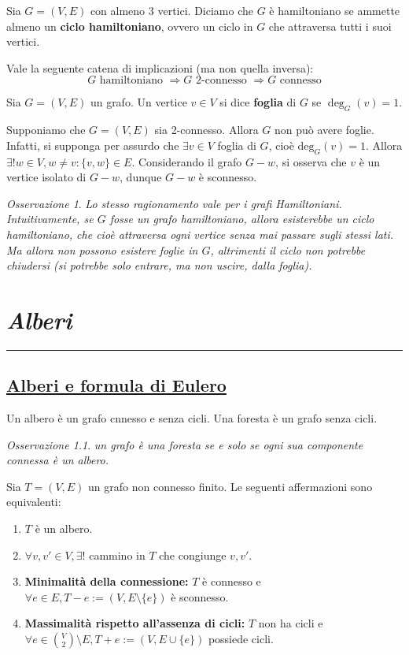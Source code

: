 \documentclass[oneside]{book}
\theoremstyle{remark}
\newtheorem*{osservaz}{Osservazione}
\newcommand{\chptr}[1]{\chapter{\textit{#1}}\noindent\rule{\textwidth}{1pt}}
\newcommand{\teorema}[1]{\section{\underline{#1}}}
\begin{document}
\begin{tcolorbox}[colback=yellow!30, colframe=yellow!30!black, title=Grafo Hamiltoniano]
Sia $G=(V,E)$ con almeno 3 vertici. Diciamo che $G$ è hamiltoniano se ammette
almeno un \textbf{ciclo hamiltoniano}, ovvero un ciclo in $G$ che attraversa
tutti i suoi vertici.
\end{tcolorbox}
\noindent Vale la seguente catena di implicazioni (ma non quella inversa):
\[ G \text{ hamiltoniano } \Longrightarrow G \text{ 2-connesso } \Longrightarrow G \text{ connesso} \]
\begin{tcolorbox}[colback=yellow!30, colframe=yellow!30!black, title=Foglia]
Sia $G=(V,E)$ un grafo. Un vertice $v\in V$ si dice \textbf{foglia} di $G$
se $\deg_G(v)=1$.
\end{tcolorbox}
\noindent Supponiamo che $G=(V,E)$ sia 2-connesso. Allora $G$ non
può avere foglie. Infatti, si supponga per assurdo che $\exists v\in V$
foglia di $G$, cioè $\text{deg}_G(v)=1$. Allora $\exists!w\in V,w\not=v:\{v,w\}\in E$.
Considerando il grafo $G-w$, si osserva che $v$ è un vertice isolato di
$G-w$, dunque $G-w$ è sconnesso.
\begin{osservaz}
\emph{Lo stesso ragionamento vale per i grafi Hamiltoniani. Intuitivamente,
se $G$ fosse un grafo hamiltoniano, allora esisterebbe un ciclo hamiltoniano,
che cioè attraversa ogni vertice senza mai passare sugli stessi lati.
Ma allora non possono esistere foglie in $G$, altrimenti il ciclo
non potrebbe chiudersi (si potrebbe solo \emph{entrare}, ma non \emph{uscire}, dalla
foglia).}
\end{osservaz}


\chptr{Alberi}
\teorema{Alberi e formula di Eulero}
\begin{tcolorbox}[colback=yellow!30, colframe=yellow!30!black, title=Alberi e Foreste]
Un albero è un grafo cnnesso e senza cicli. Una foresta è un grafo senza
cicli.
\end{tcolorbox}
\begin{osservaz}
\emph{un grafo è una foresta se e solo se ogni sua componente
connessa è un albero.}
\end{osservaz}

\begin{tcolorbox}[title={Teorema sugli alberi}]
    Sia $T=(V,E)$ un grafo non connesso finito. Le seguenti affermazioni sono
    equivalenti:
    \begin{enumerate}
        \item $T$ è un albero.
        \item $\forall v,v'\in V, \exists!$ cammino in $T$ che congiunge $v,v'$.
        \item \textbf{Minimalità della connessione:} $T$ è connesso e $\forall
        e\in E, T-e:=(V,E\setminus \{e\})$ è sconnesso.
        \item \textbf{Massimalità rispetto all'assenza di cicli:} $T$ non ha
        cicli e $\forall e \in \binom{V}{2}\setminus E, T+e:=(V,E\cup\{e\})$
        possiede cicli.
    \end{enumerate}
\end{tcolorbox}
\end{document}

